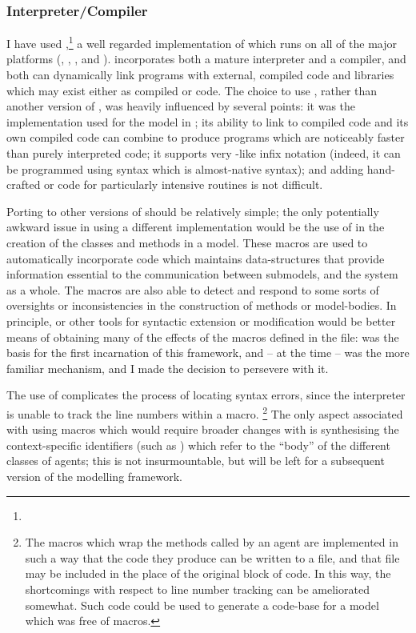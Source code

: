 \subsubsection{Interpreter/Compiler}
I have used
\GambitC,\footnote{} a well
regarded implementation of \Scheme which runs on all of the major
platforms (\Linux, \Unix, \OSX, \Android and \Windows). \Gambit
incorporates both a mature \Scheme interpreter and a compiler, and
both can dynamically link programs with external, compiled code and
libraries which may exist either as compiled \CC or \Scheme code.  The
choice to use \Gambit, rather than another version of \Scheme, was
heavily influenced by several points: it was the implementation used
for the model in \Ctwo; its ability to link to compiled \CC code and
its own compiled code can combine to produce programs which are
noticeably faster than purely interpreted code; it supports
very \CC-like infix notation (indeed, it can be programmed using
syntax which is almost-native \CC syntax); and adding hand-crafted \CC
or \Cpp code for particularly intensive routines is not difficult.

Porting \ReModel to other versions of \Scheme should be relatively
simple; the only potentially awkward issue in using a
different \Scheme implementation would be the use of \sdefmac in the
creation of the classes and methods in a model.  These macros are used
to automatically incorporate code which maintains data-structures that
provide information essential to the communication between submodels,
and the system as a whole. The macros are also able to detect and
respond to some sorts of oversights or inconsistencies in the
construction of methods or model-bodies.  In principle, \sdefsyntax or
other tools for syntactic extension or modification would be better
means of obtaining many of the effects of the macros defined in the
 file: \sdefmac was the basis for the first
incarnation of this framework, and -- at the time -- was the more
familiar mechanism, and I made the decision to persevere with it.

The use of \sdefmac complicates the process of locating syntax errors,
since the interpreter is unable to track the line numbers within a
macro. \footnote{The macros which wrap the methods called by an agent
are implemented in such a way that the code they produce can be
written to a file, and that file may be included in the place of the
original block of code.  In this way, the shortcomings with respect to
line number tracking can be ameliorated somewhat.  Such code could be
used to generate a code-base for a model which was free of macros.}
The only aspect associated with using macros which would require
broader changes with \sdefsyntax is synthesising the context-specific
identifiers (such as
) which refer to the ``body'' of the
different classes of agents; this is not insurmountable, but will be
left for a subsequent version of the modelling framework.

